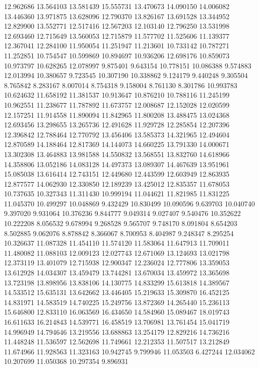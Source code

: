 12.962686
13.564103
13.581439
15.555731
13.470673
14.090150
14.006082
13.446360
13.971875
13.628096
12.790370
13.826167
13.691528
13.344952
12.829900
13.552771
12.517416
12.567203
12.103140
12.796250
13.531998
12.693460
12.715649
13.560053
12.715879
11.577702
11.525606
11.139377
12.367041
12.284100
11.950054
11.251947
11.213601
10.733142
10.787271
11.252851
10.754547
10.599869
10.894697
10.936206
12.698176
10.859073
10.973797
10.628265
12.078997
9.875401
9.643154
10.778151
10.086388
9.574883
12.013994
10.380657
9.723545
10.307190
10.338862
9.124179
9.440248
9.305504
8.765842
8.283167
8.007014
8.754318
9.158004
8.761130
8.301786
10.993783
10.624632
11.658192
11.381537
10.913647
10.876210
10.788116
11.245199
10.962551
11.238677
11.787892
11.673757
12.008687
12.152028
12.020599
12.157251
11.914558
11.890094
11.842965
11.800208
13.488475
13.024368
12.693456
13.298655
13.265736
12.491628
11.929728
12.285854
12.207396
12.396842
12.788464
12.770792
13.456406
13.585373
14.321965
12.494604
12.870589
14.188464
12.817369
14.144073
14.660225
13.791330
14.000671
13.302308
13.464883
13.981588
14.550832
13.568551
13.832760
14.618966
14.358806
13.052186
14.083128
14.497373
13.089307
14.467639
13.951961
15.085038
13.616414
12.743151
12.449680
12.443599
12.603949
12.863935
12.877577
14.062930
12.330850
12.189239
13.425012
12.835357
11.678053
10.737635
10.327343
11.311430
10.999194
11.044621
11.821985
11.831225
11.045370
10.499297
10.048869
9.432429
10.830499
10.090596
9.639703
10.040740
9.397020
9.931064
10.376236
9.844777
9.049314
9.027407
9.540476
10.352622
10.222208
8.056532
9.678994
9.268528
9.565707
9.748170
8.091804
8.654203
8.502885
9.062076
8.878842
8.366067
8.700953
8.404987
9.248347
8.295254
10.326637
11.087328
11.454110
11.574120
11.583064
11.647913
11.709011
11.480082
11.088103
12.009123
12.027743
12.671069
13.124693
13.021798
12.373119
13.401079
12.715938
12.900347
12.236024
12.777806
13.359053
13.612928
14.034307
13.459479
13.744281
13.670034
13.459972
13.365698
13.723198
13.898956
13.838106
14.130775
14.833299
15.613818
14.389567
14.533512
15.635131
13.642662
13.446405
15.219633
15.309870
16.452125
14.831971
14.583519
14.740225
15.249756
13.872369
14.265440
15.236113
15.646800
12.833110
16.063569
16.434650
14.584960
15.089467
18.019743
16.611633
16.214843
14.539771
16.458519
13.706981
13.761454
15.041719
14.996949
14.794646
13.219556
13.688863
13.254179
12.829216
14.736216
11.448248
11.536597
12.562698
11.749661
12.212353
11.507517
13.212849
11.674966
11.928563
11.323163
10.942745
9.799946
11.053503
6.427244
12.034062
10.207699
11.050368
10.297354
9.896931
